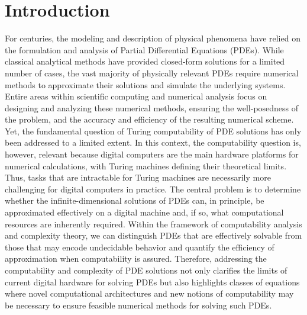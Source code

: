 \documentclass[pdflatex]{sn-jnl}%
\begin{document}
\section{Introduction}\label{sec1}
For centuries, the modeling and description of physical phenomena have relied on the formulation and analysis of Partial Differential Equations (PDEs). While classical analytical methods have provided closed-form solutions for a limited number of cases, the vast majority of physically relevant PDEs require numerical methods to approximate their solutions and simulate the underlying systems. Entire areas within scientific computing and numerical analysis focus on designing and analyzing these numerical methods, ensuring the well-posedness of the problem, and the accuracy and efficiency of the resulting numerical scheme. Yet, the fundamental question of Turing computability \cite{Church1937-sr} of PDE solutions has only been addressed to a limited extent. In this context, the computability question is, however, relevant because digital computers are the main hardware platforms for numerical calculations, with Turing machines defining their theoretical limits. Thus, tasks that are intractable for Turing machines are necessarily more challenging for digital computers in practice. The central problem is to determine whether the infinite-dimensional solutions of PDEs can, in principle, be approximated effectively on a digital machine and, if so, what computational resources are inherently required. Within the framework of computability analysis and complexity theory, we can distinguish PDEs that are effectively solvable from those that may encode undecidable behavior and quantify the efficiency of approximation when computability is assured. Therefore, addressing the computability and complexity of PDE solutions not only clarifies the limits of current digital hardware for solving PDEs but also highlights classes of equations where novel computational architectures \cite{Handler1967-ty} and new notions of computability may be necessary to ensure feasible numerical methods for solving such PDEs.

\end{document}
